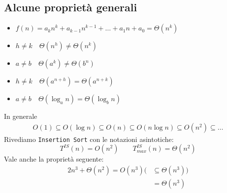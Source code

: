 \subsection{Alcune proprietà generali}
\begin{itemize}
	\item $f(n) = a_kn^k + a_{k-1}n^{k-1} + \dots + a_1n + a_0 = \Theta (n^k)$
	\item $h \neq k \quad \Theta (n^h) \neq \Theta (n^k)$
	\item $a \neq b \quad \Theta (a^k) \neq \Theta (b^n)$
	\item $h \neq k \quad \Theta (a^{n+h}) = \Theta (a^{n+k})$
	\item $a \neq b \quad \Theta (\log_an) = \Theta (\log_bn)$
\end{itemize} 
In generale
\begin{gather*}
	O(1) \subseteq O(\log n) \subseteq O(n) \subseteq O(n \log n) \subseteq O(n^2) \subseteq \dots
\end{gather*}
Rivediamo \texttt{Insertion Sort} con le notazioni asintotiche:
\begin{displaymath}
	T^{IS}(n) = O(n^2) \qquad T^{IS}_{max}(n) = \Theta (n^2)
\end{displaymath}
Vale anche la proprietà seguente:
\begin{align*}
	2n^3 + \Theta (n^2) = O(n^3) (&\subseteq \Theta (n^3)) \\
	& = \Theta (n^3)
\end{align*}